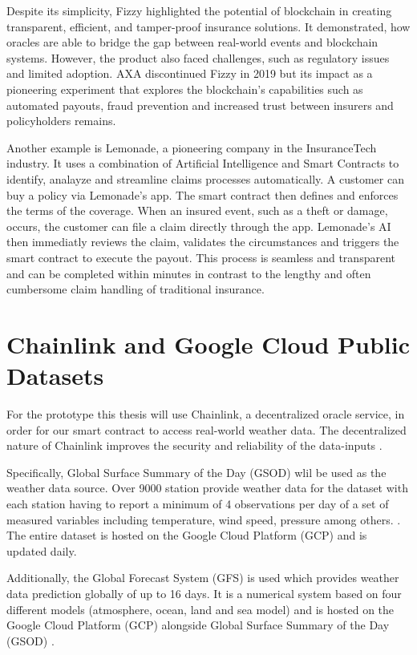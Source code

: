  Despite its simplicity, Fizzy highlighted the potential of blockchain in creating transparent, efficient, and tamper-proof insurance solutions. It demonstrated, how oracles are able to bridge the gap between real-world events and blockchain systems. However, the product also faced challenges, such as regulatory issues and limited adoption. AXA discontinued Fizzy in 2019 but its impact as a pioneering experiment that explores the blockchain's capabilities such as automated payouts, fraud prevention and increased trust between insurers and policyholders remains. \autocite{sedkaoui2021blockchain}

Another example is Lemonade, a pioneering company in the InsuranceTech industry. It uses a combination of Artificial Intelligence and Smart Contracts to identify, analayze and streamline claims processes automatically. A customer can buy a policy via Lemonade's app. The smart contract then defines and enforces the terms of the coverage. When an insured event, such as a theft or damage, occurs, the customer can file a claim directly through the app. Lemonade's AI then immediatly reviews the claim, validates the circumstances and triggers the smart contract to execute the payout. This process is seamless and transparent and can be completed within minutes in contrast to the lengthy and often cumbersome claim handling of traditional insurance. \autocite{la2023insurtech} \autocite{tardieu2020case}
 
 \section{Chainlink and Google Cloud Public Datasets}\label{section:chainlink_google_cloud_datasets}
 
 For the prototype this thesis will use Chainlink, a decentralized oracle service, in order for our smart contract to access real-world weather data. The decentralized nature of Chainlink improves the security and reliability of the data-inputs \autocite{beniiche2020study}.
 
 Specifically, Global Surface Summary of the Day (GSOD) wlil be used as the weather data source. Over 9000 station provide weather data for the dataset with each station having to report a minimum of 4 observations per day of a set of measured variables including temperature, wind speed, pressure among others. \autocite{NOAA_GSOD_2023}. The entire dataset is hosted on the Google Cloud Platform (GCP) and is updated daily.
 
 Additionally, the Global Forecast System (GFS) is used which provides weather data prediction globally of up to 16 days. It is a numerical system based on four different models (atmosphere, ocean, land and sea model) and is hosted on the Google Cloud Platform (GCP) alongside Global Surface Summary of the Day (GSOD) \autocite{NOAA_GSOD_nd}.

